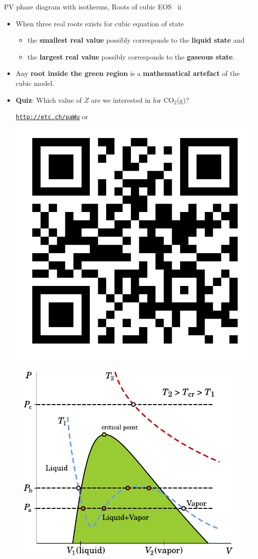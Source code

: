\begin{frame}{PV phase diagram with isotherms, Roots of cubic EOS \, ii}
\footnotesize
\lcol
\begin{itemize}[<+->]
\item When three real roots exists for cubic equation of state
\begin{itemize}
\item the \textbf{smallest real value} possibly corresponds to the \textbf{liquid state} and 
\item the \textbf{largest real value} possibly corresponds to the \textbf{gaseous state}.
\end{itemize}
\item Any \textbf{root inside the green region} is a \textbf{mathematical artefact} of the cubic model.
\item \alert{\textbf{Quiz}}: Which value of $Z$ are we interested
in for CO$_{2}$(g)?
\begin{center}
	\href{http://etc.ch/paWu}{\textcolor{indigo(dye)}{\tt http://etc.ch/paWu}} \quad or \quad 
	\includegraphics[height=0.18\columnwidth]{figures/activity-models/poll-ionic-strength.png}
\end{center} 
\end{itemize}
\rcol
\begin{figure}
\centering 
\includegraphics[width=1\textwidth]{figures/activity-models/phase-diagram-pv-cubic-eos-roots}

\end{figure}
\end{frame}
